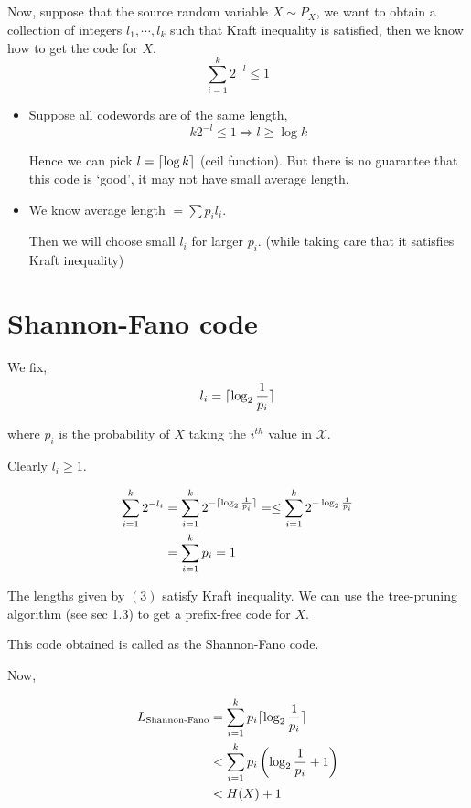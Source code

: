 \documentclass{article}
\DeclarePairedDelimiter{\ceil}{\lceil}{\rceil}
\begin{document}
\subsection{}

Now, suppose that the source random variable $X \sim P_X$, we want to obtain a collection of integers $l_1, \cdots, l_k$ such that Kraft inequality is satisfied, then we know how to get the code for $X$.
$$ \sum_{i=1}^{k} 2^{-l} \leq 1$$
\begin{itemize}
    \item Suppose all codewords are of the same length, $$ k 2^{-l} \leq 1 \Rightarrow l \geq \log k$$

    Hence we can pick $l = \ceil{\log k}$ (ceil function). But there is no guarantee that this code is `good', it may not have small average length.

    \item We know average length $= \sum p_i l_i$.

    Then we will choose small $l_i$ for larger $p_i$. (while taking care that it satisfies Kraft inequality)
\end{itemize}

\section{Shannon-Fano code}

We fix,
\begin{equation}
    l_i = \ceil{ \log_2 \frac{1}{p_i}}
\end{equation}

 where $p_i$ is the probability of $X$ taking the $i^{th}$ value in $\mathcal{X}$.

Clearly $l_i \geq 1$.

\begin{align*}
    \sum_{i=1}^k 2^{-l_i} &= \sum_{i=1}^k 2^{-\ceil{\log_2 \frac{1}{p_i}}}  =\leq \sum_{i=1}^{k} 2^{- \log_2 \frac{1}{p_i}} \\
    &= \sum_{i=1}^k p_i = 1
\end{align*}

The lengths given by $(3)$ satisfy Kraft inequality. We can use the tree-pruning algorithm (see sec 1.3) to get a prefix-free code for $X$.

This code obtained is called as the Shannon-Fano code.

Now,

\begin{align*}
    L_{\text{Shannon-Fano}} &= \sum_{i=1}^{k} p_i \ceil{\log_2 \frac{1}{p_i}} \\
    &< \sum_{i=1}^{k} p_i \left( \log_2 \frac{1}{p_i} +1 \right) \\
    &< H(X)+1
\end{align*}
\end{document}
